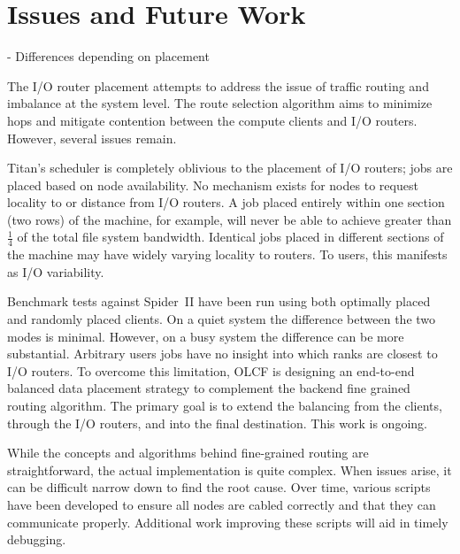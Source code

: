 \section{Issues and Future Work}

- Differences depending on placement

The I/O router placement attempts to address the issue of traffic routing and
imbalance at the system level. The route selection algorithm aims to minimize
hops and mitigate contention between the compute clients and I/O routers.
However, several issues remain.

Titan's scheduler is completely oblivious to the placement of I/O routers; jobs
are placed based on node availability.  No mechanism exists for nodes to
request locality to or distance from I/O routers.  A job placed entirely within
one section (two rows) of the machine, for example, will never be able to
achieve greater than $\frac{1}{4}$ of the total file system bandwidth.
Identical jobs placed in different sections of the machine may have widely
varying locality to routers.  To users, this manifests as I/O variability.

Benchmark tests against Spider~II have been run using both optimally placed and
randomly placed clients.  On a quiet system the difference between the two
modes is minimal.  However, on a busy system the difference can be more
substantial.  Arbitrary users jobs have no insight into which ranks are closest
to I/O routers.  To overcome this limitation, OLCF is designing an end-to-end
balanced data placement strategy to complement the backend fine grained routing
algorithm. The primary goal is to extend the balancing from the clients,
through the I/O routers, and into the final destination. This work is ongoing.

While the concepts and algorithms behind fine-grained routing are
straightforward, the actual implementation is quite complex.  When issues
arise, it can be difficult narrow down to find the root cause.  Over time,
various scripts have been developed to ensure all nodes are cabled correctly
and that they can communicate properly.  Additional work improving these
scripts will aid in timely debugging.
